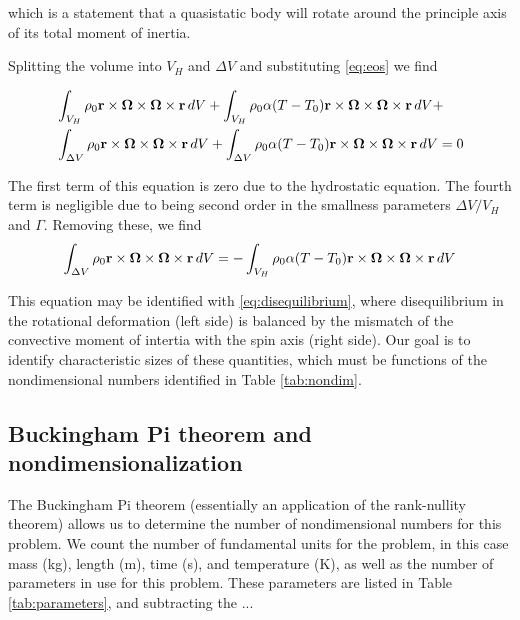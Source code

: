 \documentclass[extra,mreferee]{gji}
\newif\ifdetail
\begin{document}
which is a statement that a quasistatic body will rotate around the principle axis of its total moment of inertia.

Splitting the volume into $V_H$ and $\Delta V$ and substituting \eqref{eq:eos} we find

\begin{equation}
\begin{aligned}
&\int_{V_H} \rho_0 {\bf r \times \mitbf{\Omega} \times \mitbf{\Omega} \times {\bf r }} \,dV + 
\int_{V_H} \rho_0 \alpha (T-T_0) {\bf r \times \mitbf{\Omega} \times \mitbf{\Omega} \times {\bf r }} \,dV +  \\
&\int_{\Delta V} \rho_0 {\bf r \times \mitbf{\Omega} \times \mitbf{\Omega} \times {\bf r }} \,dV + 
\int_{\Delta V} \rho_0 \alpha (T-T_0) {\bf r \times \mitbf{\Omega} \times \mitbf{\Omega} \times {\bf r }} \,dV = 0  \\
\end{aligned}
\end{equation}

The first term of this equation is zero due to the hydrostatic equation.  
The fourth term is negligible due to being second order in the smallness parameters $\Delta V/V_H$ and $\Gamma$.
Removing these, we find
\begin{equation}
\begin{aligned}
\int_{\Delta V} \rho_0 {\bf r \times \mitbf{\Omega} \times \mitbf{\Omega} \times {\bf r }} \,dV = 
-\int_{V_H} \rho_0 \alpha (T-T_0) {\bf r \times \mitbf{\Omega} \times \mitbf{\Omega} \times {\bf r }} \,dV
\end{aligned}
\end{equation}

This equation may be identified with \eqref{eq:disequilibrium}, where disequilibrium in the rotational deformation (left side) is balanced by the mismatch of the convective moment of intertia with the spin axis (right side).
Our goal is to identify characteristic sizes of these quantities, which must be functions of the nondimensional numbers identified in Table \ref{tab:nondim}.

\ifdetail
\subsection{Buckingham Pi theorem and nondimensionalization}
The Buckingham Pi theorem (essentially an application of the rank-nullity theorem) allows us to determine the number of nondimensional numbers for this problem.
We count the number of fundamental units for the problem, in this case mass (kg), length (m), time (s), and temperature (K), as well as the number of parameters in use for this problem.  
These parameters are listed in Table \ref{tab:parameters}, and subtracting the ...
\end{document}
